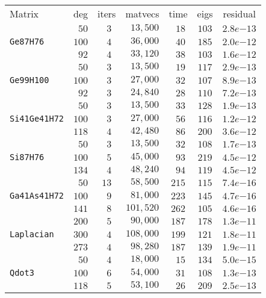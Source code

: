 \begin{tabular}{l|c|c|c|c|c|c}
\hline
\multirow{2}{*}{Matrix} & \multirow{2}{*}{deg} & \multirow{2}{*}{iters} & \multirow{2}{*}{matvecs} & \multirow{2}{*}{time} & \multirow{2}{*}{eigs} & \multirow{2}{*}{residual} \\
 & & & & & & \\\hline
\hline
 & $\phantom{0}50$ & $\phantom{0}3$ & $\phantom{0}13,500$ & $\phantom{0}18$ & $103$ & $2.8e{-13}$ \\
\verb|Ge87H76| & $100$ & $\phantom{0}4$ & $\phantom{0}36,000$ & $\phantom{0}40$ & $185$ & $2.0e{-12}$ \\
 & $\phantom{0}92$ & $\phantom{0}4$ & $\phantom{0}33,120$ & $\phantom{0}38$ & $103$ & $1.6e{-12}$ \\\hline
 & $\phantom{0}50$ & $\phantom{0}3$ & $\phantom{0}13,500$ & $\phantom{0}19$ & $117$ & $2.9e{-13}$ \\
\verb|Ge99H100| & $100$ & $\phantom{0}3$ & $\phantom{0}27,000$ & $\phantom{0}32$ & $107$ & $8.9e{-13}$ \\
 & $\phantom{0}92$ & $\phantom{0}3$ & $\phantom{0}24,840$ & $\phantom{0}28$ & $110$ & $7.2e{-13}$ \\\hline
 & $\phantom{0}50$ & $\phantom{0}3$ & $\phantom{0}13,500$ & $\phantom{0}33$ & $128$ & $1.9e{-13}$ \\
\verb|Si41Ge41H72| & $100$ & $\phantom{0}3$ & $\phantom{0}27,000$ & $\phantom{0}56$ & $116$ & $1.2e{-12}$ \\
 & $118$ & $\phantom{0}4$ & $\phantom{0}42,480$ & $\phantom{0}86$ & $200$ & $3.6e{-12}$ \\\hline
 & $\phantom{0}50$ & $\phantom{0}3$ & $\phantom{0}13,500$ & $\phantom{0}32$ & $108$ & $1.7e{-13}$ \\
\verb|Si87H76| & $100$ & $\phantom{0}5$ & $\phantom{0}45,000$ & $\phantom{0}93$ & $219$ & $4.5e{-12}$ \\
 & $134$ & $\phantom{0}4$ & $\phantom{0}48,240$ & $\phantom{0}94$ & $119$ & $4.5e{-12}$ \\\hline
 & $\phantom{0}50$ & $13$ & $\phantom{0}58,500$ & $215$ & $115$ & $7.4e{-16}$ \\
\verb|Ga41As41H72| & $100$ & $\phantom{0}9$ & $\phantom{0}81,000$ & $223$ & $145$ & $4.7e{-16}$ \\
 & $141$ & $\phantom{0}8$ & $101,520$ & $262$ & $105$ & $4.6e{-16}$ \\\hline
 & $200$ & $\phantom{0}5$ & $\phantom{0}90,000$ & $187$ & $178$ & $1.3e{-11}$ \\
\verb|Laplacian| & $300$ & $\phantom{0}4$ & $108,000$ & $199$ & $121$ & $1.8e{-11}$ \\
 & $273$ & $\phantom{0}4$ & $\phantom{0}98,280$ & $187$ & $139$ & $1.9e{-11}$ \\\hline
 & $\phantom{0}50$ & $\phantom{0}4$ & $\phantom{0}18,000$ & $\phantom{0}15$ & $134$ & $5.0e{-15}$ \\
\verb|Qdot3| & $100$ & $\phantom{0}6$ & $\phantom{0}54,000$ & $\phantom{0}31$ & $108$ & $1.3e{-13}$ \\
 & $118$ & $\phantom{0}5$ & $\phantom{0}53,100$ & $\phantom{0}26$ & $209$ & $2.5e{-13}$ \\\hline
\end{tabular}